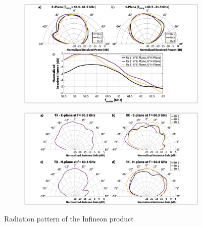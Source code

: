 \documentclass[12pt,DIV14,BCOR12mm,a4paper,footinclude=false,headinclude,parskip=half-,twoside,openright,cleardoublepage=empty,toc=index,bibliography=totoc,listof=totoc]{scrreprt}
\numberwithin{equation}{chapter}
\begin{document}
\begin{figure}[!htp]
    \centering
    \begin{subfigure}[b]{\textwidth}
        \centering
        \includegraphics[scale=.45]{figures/beampattern_product_1.png}
    \end{subfigure}
    \hspace{0.5cm}
    \begin{subfigure}[b]{\textwidth}
        \centering
        \includegraphics[scale=.45]{figures/beampattern_product_2.png}
    \end{subfigure}
    \caption{Radiation pattern of the Infineon product \cite{datasheet}}
    \label{radiation pattern of the Infineon product}
\end{figure}
\end{document}
